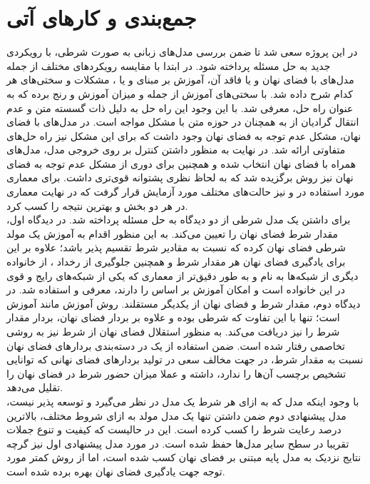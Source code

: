 \chapter{جمع‌بندی و کار‌های آتی}\label{Chap:Chap6}
\minitoc

در این پروژه سعی شد تا ضمن بررسی مدل‌های زبانی به صورت شرطی، با رویکردی جدید به حل مسئله پرداخته شود. در ابتدا با مقایسه رویکرد‌های مختلف از جمله مدل‌های با فضای نهان و یا فاقد آن، آموزش بر مبنای \maxlikelihood{} و یا \gan{}، مشکلات و سختی‌های هر کدام شرح داده شد. \gan{} با سختی‌های آموزش از جمله \modecollapse{} و میزان آموزش \discriminator{} و \generator{} رنج برده که به عنوان راه حل، \wgan{} معرفی شد. با این وجود این راه حل به دلیل ذات گسسته متن و عدم انتقال گرادیان از \discriminator{} به \generator{} همچنان در حوزه متن با مشکل مواجه است.
در مدل‌های با فضای نهان، مشکل عدم توجه به فضای نهان وجود داشت که برای این مشکل نیز راه حل‌های متفاوتی ارائه شد. در نهایت به منظور داشتن کنترل بر روی خروجی مدل، مدل‌های همراه با فضای نهان انتخاب شده و همچنین برای دوری از مشکل عدم توجه به فضای نهان نیز روش \wae{} برگزیده شد که به لحاظ نظری پشتوانه قوی‌تری داشت. برای معماری مورد استفاده در \encoder{} و \decoder{} نیز حالت‌های مختلف مورد آزمایش قرار گرفت که در نهایت معماری \transformer{} در هر دو بخش \encoder{} و \decoder{} بهترین نتیجه را کسب کرد.
\\
برای داشتن یک مدل شرطی از دو دیدگاه به حل مسئله پرداخته شد. 
در دیدگاه اول، مقدار شرط فضای نهان را تعیین می‌کند. به این منظور اقدام به آموزش یک مولد شرطی فضای نهان کرده که نسبت به مقادیر شرط تقسیم پذیر باشد؛ علاوه بر این برای یادگیری فضای نهان هر مقدار شرط و همچنین جلوگیری از رخداد \modecollapse{}، از خانواده دیگری از شبکه‌ها به نام \normalizingflownets{} و به طور دقیق‌تر از معماری  که یکی از شبکه‌های رایج و قوی در این خانواده است و امکان آموزش بر اساس \maxlikelihood{} را دارند، معرفی و استفاده شد.
در دیدگاه دوم، مقدار شرط و فضای نهان از یکدیگر مستقلند. روش آموزش مانند آموزش \wae{} است؛ تنها با این تفاوت که \decoder{} شرطی بوده و علاوه بر بردار فضای نهان، بردار مقدار شرط را نیز دریافت می‌کند. به منظور استقلال فضای نهان از شرط نیز به روشی تخاصمی رفتار شده است. ضمن استفاده از یک \classifier{} در دسته‌بندی بردار‌های فضای نهان نسبت به مقدار شرط، \encoder{} در جهت مخالف سعی در تولید بردار‌های فضای نهانی که \classifier{} توانایی تشخیص برچسب آن‌ها را ندارد، داشته و عملا میزان حضور شرط در فضای نهان را تقلیل می‌دهد.
\\
با وجود اینکه مدل \sentigan{} که به ازای هر شرط یک مدل در نظر می‌گیرد و توسعه پذیر نیست، مدل پیشنهادی دوم ضمن داشتن تنها یک مدل مولد به ازای شروط مختلف، بالاترین درصد رعایت شرط را کسب کرده است. این در حالیست که کیفیت و تنوع جملات تقریبا در سطح سایر مدل‌ها حفظ شده است. در مورد مدل پیشنهادی اول نیز گرچه نتایج نزدیک به مدل پایه مبتنی بر فضای نهان کسب شده است، اما از روش کمتر مورد توجه \normalizingflownets{} جهت یادگیری فضای نهان بهره برده شده است.
